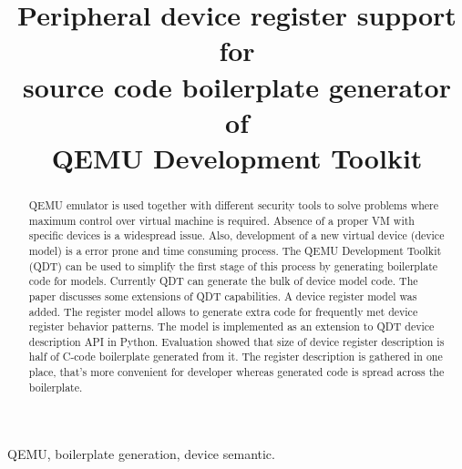 \documentclass[conference,compsoc,a4paper]{IEEEtran}
\begin{document}
\title{Peripheral device register support for\\%
source code boilerplate generator of\\%
QEMU Development Toolkit}


\author{
}


\maketitle

\begin{abstract}
QEMU emulator is used together with different security tools to solve problems
where maximum control over virtual machine is required.
Absence of a proper VM with specific devices is a widespread issue.
Also, development of a new virtual device (device model) is a error prone and
time consuming process.
The QEMU Development Toolkit (QDT) can be  used to simplify the first
stage of this process by generating boilerplate code for models.
Currently QDT can generate the bulk of device model code.
The paper discusses some extensions of QDT capabilities.
A device register model was added.
The register model allows to generate extra code for frequently met
device register behavior patterns.
The model is implemented as an  extension to QDT device description
API in Python.
Evaluation showed that size of device register description is half of
C-code boilerplate generated from it.
The register description is gathered in one place, that's more convenient
for developer whereas generated code is spread across the boilerplate.
\end{abstract}

\begin{IEEEkeywords}
QEMU, boilerplate generation, device semantic.
\end{IEEEkeywords}


\IEEEpeerreviewmaketitle
\end{document}
